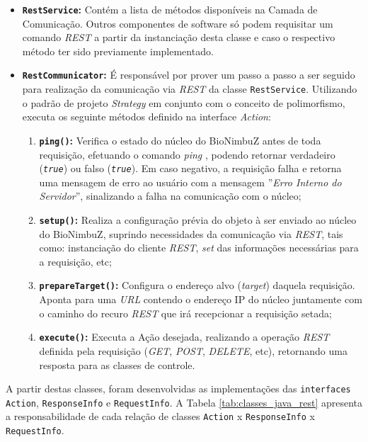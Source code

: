 \begin{itemize}
	\item \textbf{\texttt{RestService}:} Contém a lista de métodos disponíveis na Camada de Comunicação. Outros componentes de software só podem requisitar um comando \textit{REST} a partir da instanciação desta classe e caso o respectivo método ter sido previamente implementado.
	\item \textbf{\texttt{RestCommunicator}:} É responsável por prover um passo a passo a ser seguido para realização da comunicação via \textit{REST} da classe \texttt{RestService}. Utilizando o padrão de projeto \textit{Strategy} \cite{head_first_book} em conjunto com o conceito de polimorfismo, executa os seguinte métodos definido na interface \textit{Action}:
	\begin{enumerate}
		\item \textbf{\texttt{ping()}:} Verifica o estado do núcleo do BioNimbuZ antes de toda requisição, efetuando o comando \textit{ping} \cite{ping_rfc}, podendo retornar verdadeiro (\texttt{\textit{true}}) ou falso (\texttt{\textit{true}}). Em caso negativo, a requisição falha e retorna uma mensagem de erro ao usuário com a mensagem ''\textit{Erro Interno do Servidor}'', sinalizando a falha na comunicação com o núcleo;
		\item \textbf{\texttt{setup()}:} Realiza a configuração prévia do objeto à ser enviado ao núcleo do BioNimbuZ, suprindo necessidades da comunicação via \textit{REST}, tais como: instanciação do cliente \textit{REST}, \textit{set} das informações necessárias para a requisição, etc;
		\item \textbf{\texttt{prepareTarget()}:} Configura o endereço alvo (\textit{target}) daquela requisição. Aponta para uma \textit{URL} contendo o endereço IP do núcleo juntamente com o caminho do recuro \textit{REST} \cite{rest} que irá recepcionar a requisição setada;
		\item \textbf{\texttt{execute()}:} Executa a Ação desejada, realizando a operação \textit{REST} definida pela requisição (\textit{GET}, \textit{POST}, \textit{DELETE}, etc), retornando uma resposta para as classes de controle.
	\end{enumerate}
\end{itemize}

A partir destas classes, foram desenvolvidas as implementações das \texttt{interfaces} \texttt{Action}, \texttt{ResponseInfo} e \texttt{RequestInfo}. A Tabela \ref{tab:classes_java_rest} apresenta a responsabilidade de cada relação de classes \texttt{Action} x \texttt{ResponseInfo} x \texttt{RequestInfo}.


